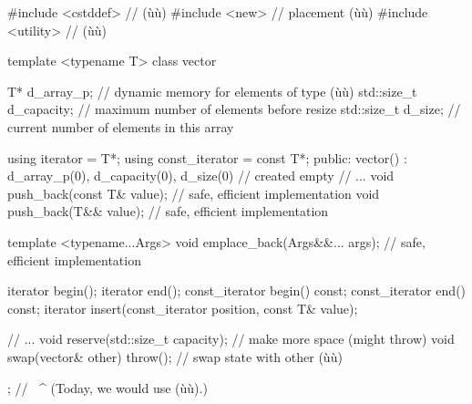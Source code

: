 \begin{emcppshiddenlisting}[emcppsbatch={e23,e25}]
#include <cstddef>  // (ù{}ù)
#include <new>      // placement (ù{}ù)
#include <utility>  // (ù{}ù)

template <typename T>
class vector
{
    T*          d_array_p;   // dynamic memory for elements of type (ù{}ù)
    std::size_t d_capacity;  // maximum number of elements before resize
    std::size_t d_size;      // current number of elements in this array

    using iterator = T*;
    using const_iterator = const T*;
public:
    vector() : d_array_p(0), d_capacity(0), d_size(0) { }  // created empty
    // ...
    void push_back(const T& value);  // safe, efficient implementation
    void push_back(T&& value);  // safe, efficient implementation

    template <typename...Args>
    void emplace_back(Args&&... args);  // safe, efficient implementation

    iterator begin();
    iterator end();
    const_iterator begin() const;
    const_iterator end() const;
    iterator insert(const_iterator position, const T& value);

    // ...
    void reserve(std::size_t capacity);  // make more space (might throw)
    void swap(vector& other) throw();    // swap state with other (ù{}ù)
};                        // ^^^^^^^        (Today, we would use (ù{}ù).)
\end{emcppshiddenlisting}
